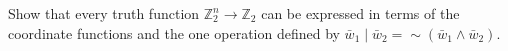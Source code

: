 Show that every truth function $\mathbb{Z}_2^n \to \mathbb{Z}_2$ can be expressed in terms of the coordinate functions and the one operation defined by $\bar{w}_1 \mid \bar{w}_2 = \sim(\bar{w}_1 \land \bar{w}_2)$.

